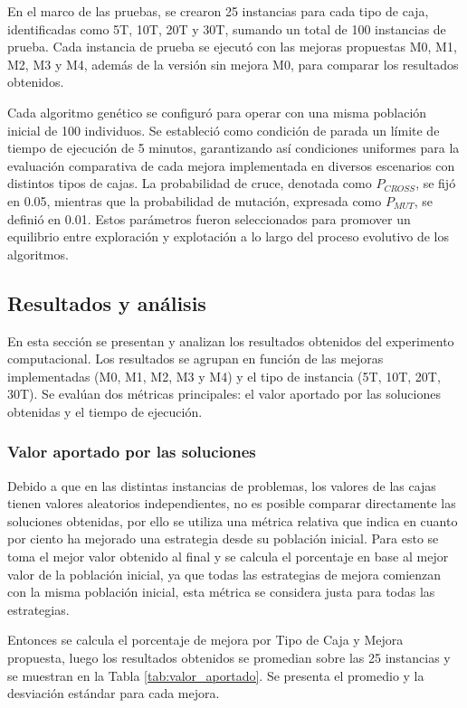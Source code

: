 En el marco de las pruebas, se crearon 25 instancias para cada tipo de caja, identificadas como 5T, 10T, 20T y 30T, sumando un total de 100 instancias de prueba. Cada instancia de prueba se ejecutó con las mejoras propuestas M0, M1, M2, M3 y M4, además de la versión sin mejora M0, para comparar los resultados obtenidos.

Cada algoritmo genético se configuró para operar con una misma población inicial de 100 individuos. Se estableció como condición de parada un límite de tiempo de ejecución de 5 minutos, garantizando así condiciones uniformes para la evaluación comparativa de cada mejora implementada en diversos escenarios con distintos tipos de cajas. La probabilidad de cruce, denotada como $P_{CROSS}$, se fijó en 0.05, mientras que la probabilidad de mutación, expresada como $P_{MUT}$, se definió en 0.01. Estos parámetros fueron seleccionados para promover un equilibrio entre exploración y explotación a lo largo del proceso evolutivo de los algoritmos.

\subsection{Resultados y análisis}

En esta sección se presentan y analizan los resultados obtenidos del experimento computacional. Los resultados se agrupan en función de las mejoras implementadas (M0, M1, M2, M3 y M4) y el tipo de instancia (5T, 10T, 20T, 30T). Se evalúan dos métricas principales: el valor aportado por las soluciones obtenidas y el tiempo de ejecución.

\subsubsection{Valor aportado por las soluciones}

Debido a que en las distintas instancias de problemas, los valores de las cajas tienen valores aleatorios independientes, no es posible comparar directamente las soluciones obtenidas, por ello se utiliza una métrica relativa que indica en cuanto por ciento ha mejorado una estrategia desde su población inicial. Para esto se toma el mejor valor obtenido al final y se calcula el porcentaje en base al mejor valor de la población inicial, ya que todas las estrategias de mejora comienzan con la misma población inicial, esta métrica se considera justa para todas las estrategias.

Entonces se calcula el porcentaje de mejora por Tipo de Caja y Mejora propuesta, luego los resultados obtenidos se promedian sobre las 25 instancias y se muestran en la Tabla \ref{tab:valor_aportado}. Se presenta el promedio y la desviación estándar para cada mejora.

